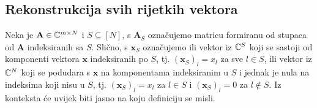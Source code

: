 \documentclass[a4paper,twoside,12pt]{memoir} %
\newcommand{\vect}[1]{\mathbf{#1}}
\renewcommand{\vec}{\vect}
\begin{document}
\subsection[Rekonstrukcija svih rijetkih vektora][Rekonstrukcija svih rijetkih vektora]{Rekonstrukcija svih rijetkih vektora}
Neka je $\vec{A} \in \C^{m \times N}$ i $S \subseteq [N]$, s $\vec A_S$ ozna\v{c}ujemo matricu formiranu od stupaca od $\vec A$ indeksiranih sa $S$. Sli\v{c}no, s $\vec x_S$ ozna\v{c}ujemo ili vektor iz $\mathbb{C}^{S}$ koji se sastoji od komponenti vektora $\vec x$ indeksiranih po $S$, tj. $(\vec x_S)_l = x_l$ za sve $l \in S$, ili vektor iz $\mathbb{C}^N$ koji se podudara s $\vec x$ na komponentama indeksiranim u $S$ i jednak je nula na indeksima koji nisu u $S$, tj. $(\vec x_S)_l = x_l$ za $l \in S$ i $(\vec x_S)_l =0$ za $ l \notin S$. Iz konteksta \'ce uvijek biti jasno na koju definiciju se misli.
\end{document}
